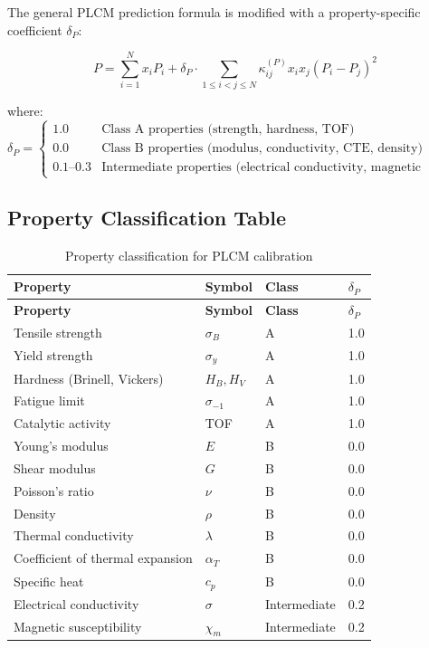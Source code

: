 \documentclass[12pt,a4paper]{article}
\begin{document}
	The general PLCM prediction formula is modified with a property-specific coefficient \(\delta_P\):
	
	\begin{equation}
		\boxed{P = \sum_{i=1}^{N} x_i P_i + \delta_P \cdot \sum_{1\le i<j\le N} \kappa_{ij}^{(P)} x_i x_j (P_i - P_j)^2}
		\label{eq:plcm-modified}
	\end{equation}
	
	where:
	\[
	\delta_P = \begin{cases}
		1.0 & \text{Class A properties (strength, hardness, TOF)} \\
		0.0 & \text{Class B properties (modulus, conductivity, CTE, density)} \\
		0.1\text{--}0.3 & \text{Intermediate properties (electrical conductivity, magnetic susceptibility)}
	\end{cases}
	\]
	
	\subsection{Property Classification Table}
	
	\begin{longtable}{p{4cm}p{3cm}p{3cm}p{3cm}}
		\caption{Property classification for PLCM calibration} \label{tab:property-classification} \\
		\toprule
		\textbf{Property} & \textbf{Symbol} & \textbf{Class} & \(\delta_P\) \\
		\midrule
		\endfirsthead
		\toprule
		\textbf{Property} & \textbf{Symbol} & \textbf{Class} & \(\delta_P\) \\
		\midrule
		\endhead
		Tensile strength & \(\sigma_B\) & A & 1.0 \\
		Yield strength & \(\sigma_y\) & A & 1.0 \\
		Hardness (Brinell, Vickers) & \(H_B, H_V\) & A & 1.0 \\
		Fatigue limit & \(\sigma_{-1}\) & A & 1.0 \\
		Catalytic activity & TOF & A & 1.0 \\
		\hline
		Young's modulus & \(E\) & B & 0.0 \\
		Shear modulus & \(G\) & B & 0.0 \\
		Poisson's ratio & \(\nu\) & B & 0.0 \\
		Density & \(\rho\) & B & 0.0 \\
		Thermal conductivity & \(\lambda\) & B & 0.0 \\
		Coefficient of thermal expansion & \(\alpha_T\) & B & 0.0 \\
		Specific heat & \(c_p\) & B & 0.0 \\
		\hline
		Electrical conductivity & \(\sigma\) & Intermediate & 0.2 \\
		Magnetic susceptibility & \(\chi_m\) & Intermediate & 0.2 \\
		\bottomrule
	\end{longtable}
	
\end{document}
